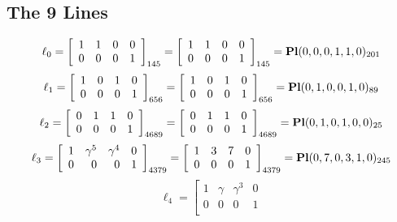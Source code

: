 \documentclass{article}
\begin{document}
{\subsection*{The 9 Lines}
$$
\ell_{0} = 
\left[
\begin{array}{*{4}{r}}
1 & 1 & 0 & 0\\
0 & 0 & 0 & 1\\
\end{array}
\right]
_{145}
=
\left[
\begin{array}{*{4}c}
1  & 1  & 0  & 0\\
0  & 0  & 0  & 1\\
\end{array}
\right]_{145}
={\rm\bf Pl}(0,0,0,1,1,0 )_{201}$$
$$
\ell_{1} = 
\left[
\begin{array}{*{4}{r}}
1 & 0 & 1 & 0\\
0 & 0 & 0 & 1\\
\end{array}
\right]
_{656}
=
\left[
\begin{array}{*{4}c}
1  & 0  & 1  & 0\\
0  & 0  & 0  & 1\\
\end{array}
\right]_{656}
={\rm\bf Pl}(0,1,0,0,1,0 )_{89}$$
$$
\ell_{2} = 
\left[
\begin{array}{*{4}{r}}
0 & 1 & 1 & 0\\
0 & 0 & 0 & 1\\
\end{array}
\right]
_{4689}
=
\left[
\begin{array}{*{4}c}
0  & 1  & 1  & 0\\
0  & 0  & 0  & 1\\
\end{array}
\right]_{4689}
={\rm\bf Pl}(0,1,0,1,0,0 )_{25}$$
$$
\ell_{3} = 
\left[
\begin{array}{*{4}{r}}
1 & \gamma^{5} & \gamma^{4} & 0\\
0 & 0 & 0 & 1\\
\end{array}
\right]
_{4379}
=
\left[
\begin{array}{*{4}c}
1  & 3  & 7  & 0\\
0  & 0  & 0  & 1\\
\end{array}
\right]_{4379}
={\rm\bf Pl}(0,7,0,3,1,0 )_{245}$$
$$
\ell_{4} = 
\left[
\begin{array}{*{4}{r}}
1 & \gamma  & \gamma^{3} & 0\\
0 & 0 & 0 & 1\\

\end{array}$$}
\end{document}
